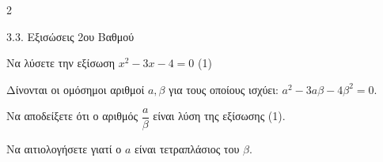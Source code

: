 \begin{ylh}{2}
    \item 3.3. Εξισώσεις 2ου Βαθμού
\end{ylh}

\begin{alist}
\item Να λύσετε την εξίσωση $x^2 - 3x - 4 = 0$ (1)
\item Δίνονται οι ομόσημοι αριθμοί $a, \beta$ για τους οποίους ισχύει: $a^2 - 3a\beta - 4\beta^2 = 0$.
\begin{rlist}
\item
  Να αποδείξετε ότι ο αριθμός $\dfrac{a}{\beta}$ είναι λύση της εξίσωσης (1).

\item
  Να αιτιολογήσετε γιατί ο $a$ είναι τετραπλάσιος του $\beta$.
\end{rlist}
\end{alist}

